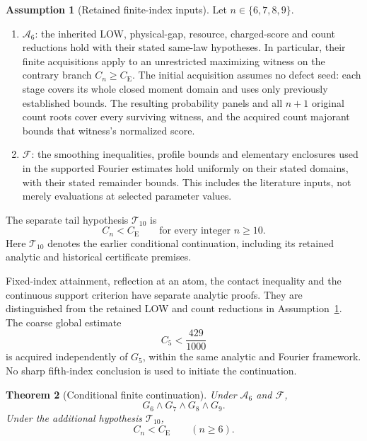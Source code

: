 \documentclass[11pt,a4paper]{article}
\newtheorem{theorem}{Theorem}
\theoremstyle{definition}
\newtheorem{assumption}[theorem]{Assumption}
\newcommand{\CE}{C_{\mathrm E}}
\begin{document}
\begin{assumption}[Retained finite-index inputs]
\label{cut6:ass:inputs}
Let \(n\in\{6,7,8,9\}\).
\begin{enumerate}[label=(\roman*),leftmargin=*]
\item \(\mathcal A_6\): the inherited LOW, physical-gap, resource,
charged-score and count reductions hold with their stated same-law
hypotheses. In particular, their finite acquisitions apply to an
unrestricted maximizing witness on the contrary branch \(C_n\ge\CE\).
The initial acquisition assumes no defect seed: each stage covers its
whole closed moment domain and uses only previously established bounds.
The resulting probability panels and all \(n+1\) original count roots
cover every surviving witness, and the acquired count majorant bounds
that witness's normalized score.
\item \(\mathcal F\): the smoothing inequalities, profile bounds and
elementary enclosures used in the supported Fourier estimates hold
uniformly on their stated domains, with their stated remainder bounds.
This includes the literature inputs, not merely evaluations at selected
parameter values.
\end{enumerate}
The separate tail hypothesis \(\mathcal T_{10}\) is
\[
 C_n<\CE\qquad\text{for every integer }n\ge10.
\]
Here \(\mathcal T_{10}\) denotes the earlier conditional continuation,
including its retained analytic and historical certificate premises.
\end{assumption}

Fixed-index attainment, reflection at an atom, the contact inequality and
the continuous support criterion have separate analytic proofs. They
are distinguished from the retained LOW and count reductions in
Assumption~\ref{cut6:ass:inputs}. The coarse global estimate
\begin{equation}
 C_5<\frac{429}{1000}
 \label{cut6:eq:coarse5}
\end{equation}
is acquired independently of \(G_5\), within the same analytic and
Fourier framework. No sharp fifth-index conclusion is used to initiate
the continuation.

\begin{theorem}[Conditional finite continuation]
\label{cut6:thm:finite}
Under \(\mathcal A_6\) and \(\mathcal F\),
\[
 G_6\wedge G_7\wedge G_8\wedge G_9.
\]
Under the additional hypothesis \(\mathcal T_{10}\),
\[
 C_n<\CE\qquad(n\ge6).
\]
\end{theorem}
\end{document}

